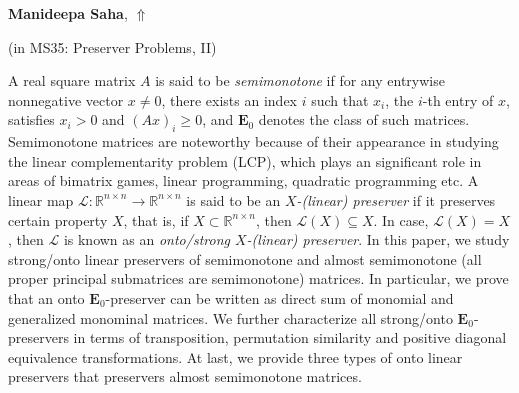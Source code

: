 \documentclass[ILAS2025-program.tex]{subfiles}
\begin{document}
\hypertarget{down0318}{}\begin{ilasabstract}
    
\textbf{Manideepa Saha},  \hfill \hyperlink{up0318}{$\Uparrow$}
    
    
(in {\color{mstitle}MS35: Preserver Problems, II})
        
\mtskip
    A real square matrix $A$ is said to be {\it semimonotone} if for any entrywise nonnegative vector $x\neq 0$, there exists an index $i$ such that  $x_i$, the $i$-th entry of $x$, satisfies $x_i>0$ and $(Ax)_i\ge 0$, and $\mathbf{E}_{0}$ denotes the class of such matrices.  Semimonotone matrices are noteworthy because of their appearance in studying the linear complementarity problem (LCP), which plays an significant role in areas of  bimatrix games, linear programming, quadratic programming etc.   A linear  map $\mathcal{L}:\mathbb{R}^{n\times n}\to\mathbb{R}^{n\times n}$ is said to be an {\it$X$-(linear) preserver} if it preserves certain property $X$, that is, if $X\subset\mathbb{R}^{n\times n}$, then $\mathcal{L}(X)\subseteq X$. In case, $\mathcal{L}(X)= X$, then $\mathcal{L}$ is known as an {\it onto/strong $X$-(linear) preserver}. In this paper, we study strong/onto linear preservers of semimonotone  and almost semimonotone (all proper principal submatrices are semimonotone) matrices. In particular, we prove that an onto $\mathbf{E}_0$-preserver can be written as direct sum of monomial and generalized monominal matrices. We further characterize all strong/onto $\mathbf{E}_0$-preservers in terms of transposition, permutation similarity and positive diagonal equivalence transformations. At last, we provide three types of onto linear preservers that preservers almost semimonotone matrices.

\end{ilasabstract}
    
\end{document}
